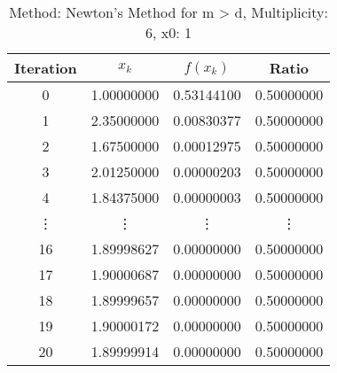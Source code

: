\begin{table}
\centering
\caption{Method: Newton's Method for m > d, Multiplicity: 6, x0: 1}
\label{tab:table_Newton's_Method_for_m_>_d_6_1}
\begin{tabular}{c c c c}
\toprule
Iteration &      $x_k$ &   $f(x_k)$ &      Ratio \\
\midrule
        0 & 1.00000000 & 0.53144100 & 0.50000000 \\
        1 & 2.35000000 & 0.00830377 & 0.50000000 \\
        2 & 1.67500000 & 0.00012975 & 0.50000000 \\
        3 & 2.01250000 & 0.00000203 & 0.50000000 \\
        4 & 1.84375000 & 0.00000003 & 0.50000000 \\
   \vdots &     \vdots &     \vdots &     \vdots \\
       16 & 1.89998627 & 0.00000000 & 0.50000000 \\
       17 & 1.90000687 & 0.00000000 & 0.50000000 \\
       18 & 1.89999657 & 0.00000000 & 0.50000000 \\
       19 & 1.90000172 & 0.00000000 & 0.50000000 \\
       20 & 1.89999914 & 0.00000000 & 0.50000000 \\
\bottomrule
\end{tabular}
\end{table}
